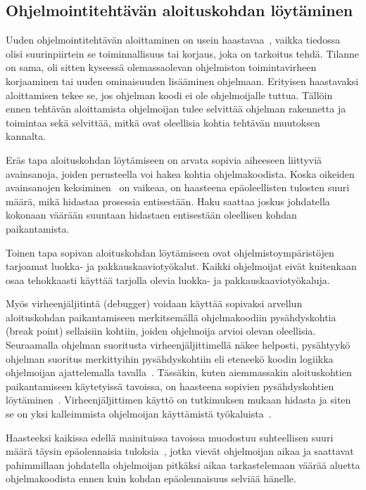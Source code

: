 \documentclass[finnish]{tktltiki2}
\theoremstyle{definition}
\theoremstyle{remark}
\begin{document}
\subsection{Ohjelmointitehtävän aloituskohdan löytäminen}

Uuden ohjelmointitehtävän aloittaminen on usein haastavaa~\cite{questions-during-software-evolution-tasks}, vaikka tiedossa olisi suurinpiirtein se toiminnallisuus tai korjaus, joka on tarkoitus tehdä. Tilanne on sama, oli sitten kyseessä olemassaolevan ohjelmiston toimintavirheen korjaaminen tai uuden ominaisuuden lisääminen ohjelmaan. Erityisen haastavaksi aloittamisen tekee se, jos ohjelman koodi ei ole ohjelmoijalle tuttua. Tällöin ennen tehtävän aloittamista ohjelmoijan tulee selvittää ohjelman rakennetta ja toimintaa sekä selvittää, mitkä ovat oleellisia kohtia tehtävän muutoksen kannalta.

Eräs tapa aloituskohdan löytämiseen on arvata sopivia aiheeseen liittyviä avainsanoja, joiden perusteella voi hakea kohtia ohjelmakoodista. Koska oikeiden avainsanojen keksiminen~\cite{what-to-search-for} on vaikeaa, on haasteena epäoleellisten tulosten suuri määrä, mikä hidastaa prosessia entisestään. Haku saattaa joskus johdatella kokonaan väärään suuntaan hidastaen entisestään oleellisen kohdan paikantamista.

Toinen tapa sopivan aloituskohdan löytämiseen ovat ohjelmistoympäristöjen tarjoamat luokka- ja pakkauskaaviotyökalut. Kaikki ohjelmoijat eivät kuitenkaan osaa tehokkaasti käyttää tarjolla olevia luokka- ja pakkauskaaviotyökaluja.

Myös virheenjäljitintä (debugger) voidaan käyttää sopivaksi arvellun aloituskohdan paikantamiseen merkitsemällä ohjelmakoodiin pysähdyskohtia (break point) sellaisiin kohtiin, joiden ohjelmoija arvioi olevan oleellisia.
Seuraamalla ohjelman suoritusta virheenjäljittimellä näkee helposti, pysähtyykö ohjelman suoritus merkittyihin pysähdyskohtiin eli eteneekö koodin logiikka ohjelmoijan ajattelemalla tavalla~\cite{eliciting-design-requirements-for-maintenance-oriented-ides}.
Tässäkin, kuten aiemmassakin aloituskohtien paikantamiseen käytetyissä tavoissa, on haasteena sopivien pysähdyskohtien löytäminen~\cite{eliciting-design-requirements-for-maintenance-oriented-ides}.
Virheenjäljittimen käyttö on tutkimuksen mukaan hidasta ja siten se on yksi kalleimmista ohjelmoijan käyttämistä työkaluista~\cite{debugging-is-expensive}.


Haasteeksi kaikissa edellä mainituissa tavoissa muodostuu suhteellisen suuri määrä täysin epäolennaisia tuloksia~\cite{eliciting-design-requirements-for-maintenance-oriented-ides}, jotka vievät ohjelmoijan aikaa ja saattavat pahimmillaan johdatella ohjelmoijan pitkäksi aikaa tarkastelemaan väärää aluetta ohjelmakoodista ennen kuin kohdan epäolennaisuus selviää hänelle.
\end{document}
